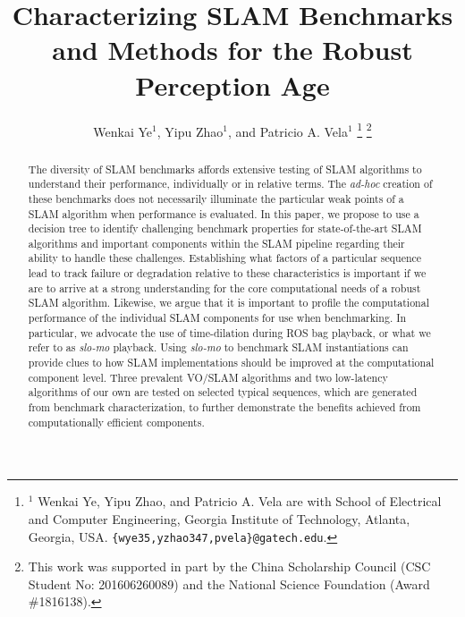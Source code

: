 \title{\LARGE \bf
Characterizing SLAM Benchmarks and Methods for the Robust Perception Age
}

\author{Wenkai Ye$^{1}$, Yipu Zhao$^{1}$, and Patricio A. Vela$^{1}$%
\thanks{$^{1}$%
Wenkai Ye, Yipu Zhao, and Patricio A. Vela  
are with School of Electrical and Computer Engineering, 
Georgia Institute of Technology, Atlanta, Georgia, USA. 
{\tt\small \{wye35,yzhao347,pvela\}@gatech.edu}. }%
\thanks{
This work was supported in part by the China Scholarship Council 
(CSC Student No: 201606260089) and the National Science Foundation 
(Award \#1816138).
}%
}

\usepackage{url}
\usepackage{slam_macros}


\graphicspath{ {./images/}}



\maketitle
\thispagestyle{empty}
\pagestyle{empty}

\begin{abstract}
The diversity of SLAM benchmarks affords extensive testing of SLAM
algorithms to understand their performance, individually or in relative
terms. The \textit{ad-hoc} creation of these benchmarks does not necessarily
illuminate the particular weak points of a SLAM algorithm when performance is
evaluated. In this paper, we propose to use a decision tree to identify challenging 
benchmark properties for state-of-the-art SLAM algorithms and important components 
within the SLAM pipeline regarding their ability to handle these challenges.
Establishing what factors of a particular
sequence lead to track failure or degradation relative to these
characteristics is important if we are to arrive at a strong 
understanding for the core computational needs of a robust SLAM algorithm.
Likewise, we argue that it is important to profile the computational
performance of the individual SLAM components for use when benchmarking.
In particular, we advocate the use of time-dilation during ROS bag
playback, or what we refer to as \textit{slo-mo} playback. 
Using \textit{slo-mo} to benchmark SLAM instantiations can provide clues to how
SLAM implementations should be improved at the computational component
level. Three prevalent VO/SLAM algorithms and two low-latency algorithms 
of our own are tested on selected typical sequences, which are generated from 
benchmark characterization, to further demonstrate the benefits achieved from 
computationally efficient components.
\end{abstract}


